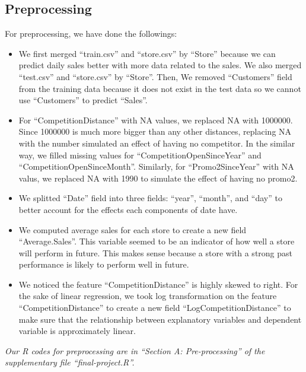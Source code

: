 \documentclass[letterpaper,twocolumn,11pt]{article}
\begin{document}
\subsection{Preprocessing}
For preprocessing, we have done the followings:
\begin{itemize}
\item We first merged ``train.csv'' and ``store.csv'' by ``Store'' because we can predict daily sales better with more data related to the sales. We also merged ``test.csv'' and ``store.csv'' by ``Store''. Then, We removed ``Customers'' field from the training data because it does not exist in the test data so we cannot use ``Customers'' to predict ``Sales''.
\item For ``CompetitionDistance'' with NA values, we replaced NA with 1000000. Since 1000000 is much more bigger than any other distances, replacing NA with the number simulated an effect of having no competitor. In the similar way, we filled missing values for ``CompetitionOpenSinceYear'' and ``CompetitionOpenSinceMonth''. Similarly, for ``Promo2SinceYear'' with NA valus, we replaced NA with 1990 to simulate the effect of having no promo2.
\item We splitted ``Date'' field into three fields: ``year'', ``month'', and ``day'' to better account for the effects each components of date have.
\item We computed average sales for each store to create a new field ``Average.Sales''. This variable seemed to be an indicator of how well a store will perform in future. This makes sense because a store with a strong past performance is likely to perform well in future.
\item  We noticed the feature ``CompetitionDistance'' is highly skewed to right. For the sake of linear regression, we took log transformation on the feature ``CompetitionDistance'' to create a new field ``LogCompetitionDistance'' to make sure that the relationship between explanatory variables and dependent variable is approximately linear.
\end{itemize}

\textit{Our R codes for preprocessing are in ``Section A: Pre-processing'' of the supplementary file ``final-project.R''.}
\end{document}
